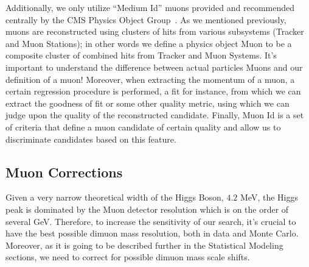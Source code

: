 Additionally, we only utilize ``Medium Id'' muons provided and recommended centrally by the CMS Physics Object Group~\cite{CMSMuonPOG,CMSMuonId}. As we mentioned previously, muons are reconstructed using clusters of hits from various subsystems (Tracker and Muon Stations); in other words we define a physics object Muon to be a composite cluster of combined hits from Tracker and Muon Systems. It's important to understand the difference between actual particles Muons and our definition of a muon! Moreover, when extracting the momentum of a muon, a certain regression procedure is performed, a fit for instance, from which we can extract the goodness of fit or some other quality metric, using which we can judge upon the quality of the reconstructed candidate. Finally, Muon Id is a set of criteria that define a muon candidate of certain quality and allow us to discriminate candidates based on this feature.

\subsection{Muon Corrections}
Given a very narrow theoretical width of the Higgs Boson, $4.2$ MeV, the Higgs peak is dominated by the Muon detector resolution which is on the order of several GeV. Therefore, to increase the sensitivity of our search, it's crucial to have the best possible dimuon mass resolution, both in data and Monte Carlo. Moreover, as it is going to be described further in the Statistical Modeling sections, we need to correct for possible dimuon mass scale shifts.

